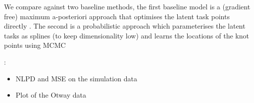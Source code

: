 We compare against two baseline methods, the first baseline model is a
(gradient free) maximum a-posteriori approach that optimises the latent task
points directly . The second is a
probabilistic approach which parameterises the latent tasks as splines (to keep
dimensionality low) and learns the locations of the knot points using MCMC

:
\begin{itemize}
    \item NLPD and MSE on the simulation data
    \item Plot of the Otway data
\end{itemize}
